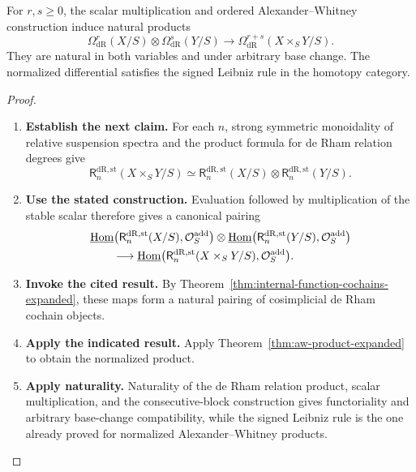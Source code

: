 \begin{proposition}
For \(r,s\geq0\), the scalar multiplication and ordered Alexander--Whitney construction induce
natural products
\[
  \Omega^r_{\mathrm{dR}}(X/S)
  \otimes
  \Omega^s_{\mathrm{dR}}(Y/S)
  \longrightarrow
  \Omega^{r+s}_{\mathrm{dR}}(X\times_SY/S).
\]
They are natural in both variables and under arbitrary base change. The normalized
differential satisfies the signed Leibniz rule in the homotopy category.
\end{proposition}

\begin{proof}
\leavevmode
\begin{enumerate}[label=\textup{(\arabic*)}]
    \item \textbf{Establish the next claim.}
    For each \(n\), strong symmetric monoidality of relative suspension spectra and the
    product formula for de Rham relation degrees give
    \[
    \mathsf{R}^{\mathrm{dR},\mathrm{st}}_n(X\times_SY/S)
    \simeq
    \mathsf{R}^{\mathrm{dR},\mathrm{st}}_n(X/S)
    \otimes
    \mathsf{R}^{\mathrm{dR},\mathrm{st}}_n(Y/S).
    \]
    \item \textbf{Use the stated construction.}
    Evaluation followed by multiplication of the stable scalar therefore gives a
    canonical pairing
    \[
    \begin{aligned}
    &\underline{\operatorname{Hom}}
    \bigl(\mathsf{R}^{\mathrm{dR},\mathrm{st}}_n(X/S),\mathcal O_S^{\mathrm{add}}\bigr)
    \otimes
    \underline{\operatorname{Hom}}
    \bigl(\mathsf{R}^{\mathrm{dR},\mathrm{st}}_n(Y/S),\mathcal O_S^{\mathrm{add}}\bigr)
    \\
    &\qquad\longrightarrow
    \underline{\operatorname{Hom}}
    \bigl(\mathsf{R}^{\mathrm{dR},\mathrm{st}}_n(X\times_SY/S),\mathcal O_S^{\mathrm{add}}\bigr).
    \end{aligned}
    \]
    \item \textbf{Invoke the cited result.}
    By Theorem~\ref{thm:internal-function-cochains-expanded}, these maps form a natural
    pairing of cosimplicial de Rham cochain objects.
    \item \textbf{Apply the indicated result.}
    Apply
    Theorem~\ref{thm:aw-product-expanded} to obtain the normalized product.
    \item \textbf{Apply naturality.}
    Naturality
    of the de Rham relation product, scalar multiplication, and the consecutive-block
    construction gives functoriality and arbitrary base-change compatibility, while
    the signed Leibniz rule is the one already proved for normalized Alexander--Whitney
    products.
\end{enumerate}
\end{proof}

